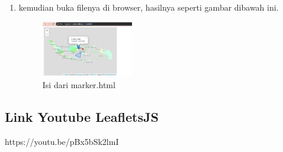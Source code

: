 \begin{enumerate}
\item kemudian buka filenya di browser, hasilnya seperti gambar dibawah ini.
\hfill\break
\begin{figure}[H]
\includegraphics[width=4cm]{figures/tugas5/1174054/5.png}
\centering
\caption{Isi dari marker.html}
\end{figure}

\end{enumerate}

\subsection{Link Youtube LeafletsJS}
https://youtu.be/pBx5bSk2lmI